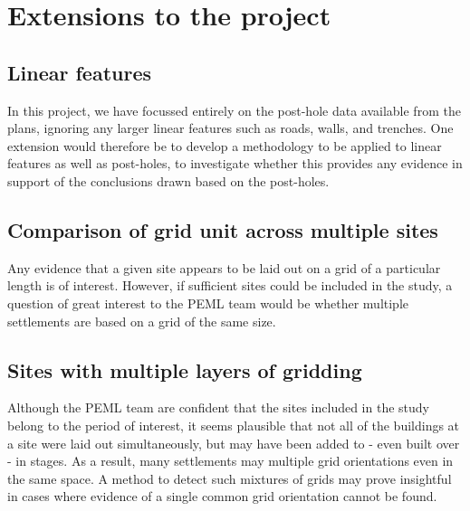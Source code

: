 \documentclass[../../ArchStats.tex]{subfiles}
\begin{document}
\section{Extensions to the project}

\subsection{Linear features}
In this project, we have focussed entirely on the post-hole data available from the plans, ignoring any larger linear features such as roads, walls, and trenches. One extension would therefore be to develop a methodology to be applied to linear features as well as post-holes, to investigate whether this provides any evidence in support of the conclusions drawn based on the post-holes.

\subsection{Comparison of grid unit across multiple sites}
Any evidence that a given site appears to be laid out on a grid of a particular length is of interest. However, if sufficient sites could be included in the study, a question of great interest to the PEML team would be whether multiple settlements are based on a grid of the same size.

\subsection{Sites with multiple layers of gridding}
Although the PEML team are confident that the sites included in the study belong to the period of interest, it seems plausible that not all of the buildings at a site were laid out simultaneously, but may have been added to - even built over - in stages. As a result, many settlements may multiple grid orientations even in the same space. A method to detect such mixtures of grids may prove insightful in cases where evidence of a single common grid orientation cannot be found.
\end{document}
